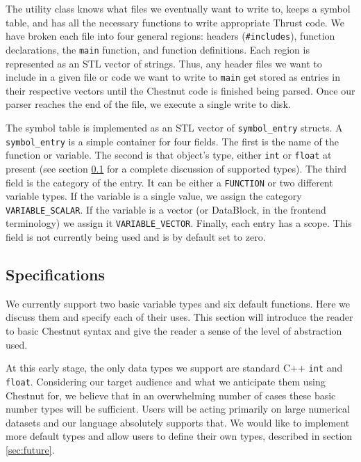 \documentclass{article}
\renewcommand{\|}{\origbar} %
\newcommand{\code}[1]{\texttt{#1}}
\begin{document}
The utility class knows what files we eventually want to write to, keeps a symbol table, and has all the necessary functions to write appropriate Thrust code. We have broken each file into four general regions: headers (\code{\#includes}), function declarations, the \code{main} function, and function definitions. Each region is represented as an STL vector of strings. Thus, any header files we want to include in a given file or code we want to write to \code{main} get stored as entries in their respective vectors until the Chestnut code is finished being parsed. Once our parser reaches the end of the file, we execute a single write to disk.

The symbol table is implemented as an STL vector of \code{symbol\_entry} structs. A \code{symbol\_entry} is a simple container for four fields. The first is the name of the function or variable. The second is that object's type, either \code{int} or \code{float} at present (see section \ref{sec:specifications} for a complete discussion of supported types). The third field is the category of the entry. It can be either a \code{FUNCTION} or two different variable types. If the variable is a single value, we assign the category \code{VARIABLE\_SCALAR}. If the variable is a vector (or DataBlock, in the frontend terminology) we assign it \code{VARIABLE\_VECTOR}. Finally, each entry has a scope. This field is not currently being used and is by default set to zero. 

\subsection{Specifications}
\label{sec:specifications}

We currently support two basic variable types and six default functions. Here we discuss them and specify each of their uses. This section will introduce the reader to basic Chestnut syntax and give the reader a sense of the level of abstraction used.

At this early stage, the only data types we support are standard C++ \code{int} and \code{float}. Considering our target audience and what we anticipate them using Chestnut for, we believe that in an overwhelming number of cases these basic number types will be sufficient. Users will be acting primarily on large numerical datasets and our language absolutely supports that. We would like to implement more default types and allow users to define their own types, described in section \ref{sec:future}.
\end{document}
